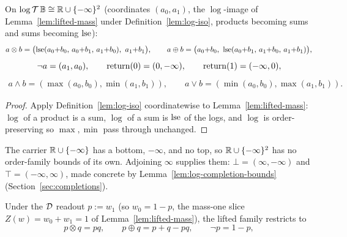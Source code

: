 
\begin{lemma}
\label{lem:lifted-log}
\leanok
On $\log\mathcal T\,\mathbb B \cong \mathbb R \cup \{-\infty\}^2$ (coordinates $(a_0,a_1)$, the
$\log$-image of Lemma~\ref{lem:lifted-mass} under
Definition~\ref{lem:log-iso}, products becoming sums and sums becoming
$\operatorname{lse}$):
\[
  a \otimes b = \bigl(\lse(a_0{+}b_0,\,a_0{+}b_1,\,a_1{+}b_0),\ a_1{+}b_1\bigr),
  \qquad
  a \oplus b = \bigl(a_0{+}b_0,\ \lse(a_0{+}b_1,\,a_1{+}b_0,\,a_1{+}b_1)\bigr),
\]
\[
  \neg a = (a_1,a_0), \qquad
  \mathrm{return}(0)=(0,-\infty), \qquad \mathrm{return}(1)=(-\infty,0),
\]
\begin{gather*}
  a \wedge b = (\max(a_0,b_0), \min(a_1,b_1)), \qquad
  a \vee b = (\min(a_0,b_0), \max(a_1,b_1)).
\end{gather*}
\end{lemma}

\begin{proof}
\leanok
Apply Definition~\ref{lem:log-iso} coordinatewise to
Lemma~\ref{lem:lifted-mass}: $\log$ of a product is a sum, $\log$ of a
sum is $\operatorname{lse}$ of the logs, and $\log$ is order-preserving so
$\max,\min$ pass through unchanged.
\end{proof}

The carrier $\mathbb R \cup \{-\infty\}$ has a bottom, $-\infty$, and no top, so $\mathbb R \cup \{-\infty\}^2$
has no order-family bounds of its own. Adjoining $\infty$ supplies them:
$\bot=(\infty,-\infty)$ and $\top=(-\infty,\infty)$, made concrete by
Lemma~\ref{lem:log-completion-bounds} (Section~\ref{sec:completions}).

\begin{lemma}
\label{lem:lifted-prob-readout}
\leanok
Under the $\mathcal D$ readout $p := w_1$ (so $w_0 = 1-p$, the mass-one
slice $Z(w) = w_0+w_1=1$ of Lemma~\ref{lem:lifted-mass}), the lifted
family restricts to
\[
  p \otimes q = pq, \qquad p \oplus q = p+q-pq, \qquad \neg p = 1-p,
\]
\end{lemma}

